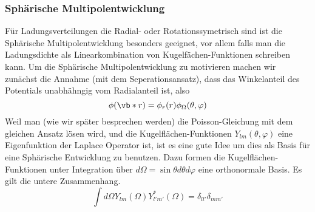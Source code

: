 \subsubsection{Sphärische Multipolentwicklung}%
\label{ssub:sphaerische-Multipolentwicklung}
Für Ladungsverteilungen die Radial- oder Rotationssymetrisch sind ist die 
Sphärische Multipolentwicklung besonders geeignet, vor allem falls man die 
Ladungsdichte als Linearkombination von Kugelfächen-Funktionen schreiben 
kann. Um die Sphärische Multipolentwicklung zu motivieren machen wir 
zunächst die Annahme (mit dem Seperationsansatz), dass das 
Winkelanteil des Potentials unabhähngig vom Radialanteil ist, also
\begin{equation*}
  \phi(\vb*r) = \phi_r(r)\phi_\Omega(\theta,\varphi)
\end{equation*}
Weil man (wie wir später besprechen werden) die Poisson-Gleichung mit dem
gleichen Ansatz lösen wird, und die Kugelflächen-Funktionen 
$Y_{lm}(\theta,\varphi)$ eine Eigenfunktion der Laplace Operator ist, 
ist es eine gute Idee um dies als Basis für eine Sphärische Entwicklung 
zu benutzen. Dazu formen die Kugelflächen-Funktionen unter Integration über
$d\Omega=\sin\theta d\theta d\varphi$ eine orthonormale Basis. Es gilt die untere Zusammenhang.
\begin{equation*}
  \int d\Omega Y_{lm}(\Omega)Y^*_{l'm'}(\Omega)=\delta_{ll'}\delta_{mm'}
\end{equation*}

